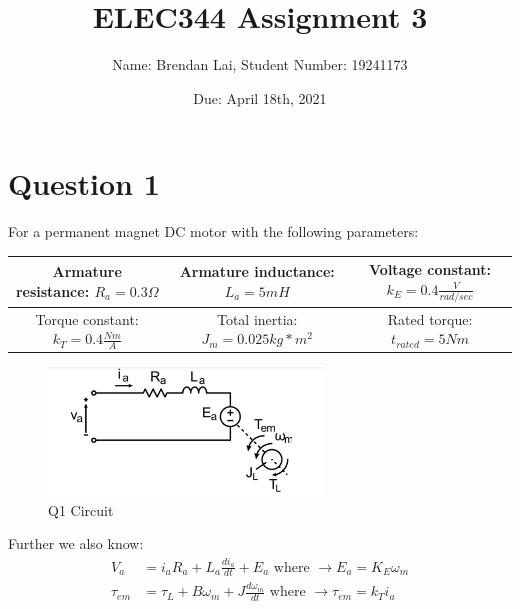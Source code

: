\documentclass{article}
\title{ELEC344 Assignment 3}
\author{Name: Brendan Lai, Student Number: 19241173}
\date{Due: April 18th, 2021}
\begin{document}
\maketitle
  
\tableofcontents

\section{Question 1}
For a permanent magnet DC motor with the following parameters:
\begin{center}
 \begin{tabular}{| c | c | c |} 
 \hline
 Armature resistance: $R_a = 0.3 \Omega$ & Armature inductance: $L_a = 5mH$ & Voltage constant: $k_E = 0.4 \frac{V}{rad/sec}$ \\ 
 \hline
 Torque constant: $k_T = 0.4 \frac{Nm}{A}$ & Total inertia: $J_m = 0.025 kg*m^2$ & Rated torque: $t_{rated} = 5Nm$\\
 \hline
\end{tabular}
\end{center}
\begin{figure}[H]
    \centering
    \includegraphics[width=0.65\textwidth]{q1-1.png}
    \caption{Q1 Circuit}
\end{figure}
Further we also know:
\begin{align*}
    V_a &= i_a R_a + L_a \frac{di_a}{dt}+E_a \mbox{ where } \longrightarrow E_a = K_E\omega_m\\
    \tau_{em} &= \tau_L + B \omega_m + J \frac{d\omega_m}{dt}\mbox{ where } \longrightarrow \tau_{em} = k_T i_a
\end{align*}
\end{document}
